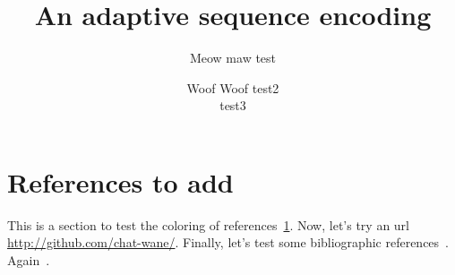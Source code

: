 \documentclass{class-for-drafts}
\title{An adaptive sequence encoding}
\author{Meow maw \aff test \and Woof Woof \aff test2 \\ test3}
\begin{document}
\maketitle

\section{References to add}
\label{sec:reference_test}

This is a section to test the coloring of
references~\ref{sec:reference_test}. Now, let's try an url
\url{http://github.com/chat-wane/}. Finally, let's test some bibliographic
references~\cite{nedelec2013lseq}. Again~\cite{nedelec2016crate,nedelec2015spray}.

\blinddocument

%

\end{document}
